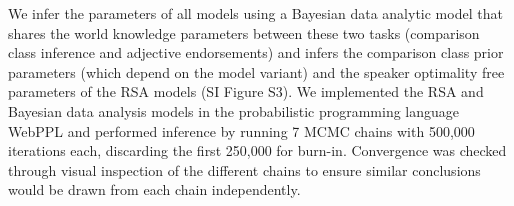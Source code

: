 \documentclass[doc, floatsintext]{apa6}
\begin{document}




We infer the parameters of all models using a Bayesian data analytic model that shares the world knowledge parameters between these two tasks (comparison class inference and adjective endorsements) and infers the comparison class prior parameters (which depend on the model variant) and the speaker optimality free parameters of the RSA models (SI Figure S3).
We implemented the RSA and Bayesian data analysis models in the probabilistic programming language WebPPL \cite{dippl} and performed inference by running 7 MCMC chains with 500,000 iterations each, discarding the first 250,000 for burn-in.
Convergence was checked through visual inspection of the different chains to ensure similar conclusions would be drawn from each chain independently.
\end{document}
